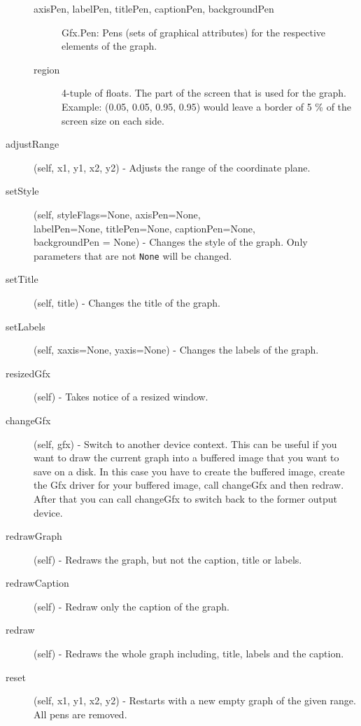 \documentclass[12pt,a4paper,USenglish]{article}
\begin{document}
\begin{description}
\begin{description}
\item[axisPen, labelPen, titlePen, captionPen, backgroundPen] Gfx.Pen: 
	Pens (sets of graphical attributes) for the respective elements 
        of the graph.
\item[region] 4-tuple of floats. The part of the screen that is used 
	for the graph. Example: (0.05, 0.05, 0.95, 0.95) would leave a 
	border of 5 \% of the screen size on each side.

\end{description}

\item[adjustRange] (self, x1, y1, x2, y2) - Adjusts the range of the
  coordinate plane.

\item[setStyle] (self, styleFlags=None, axisPen=None,\\ 
      labelPen=None, titlePen=None, captionPen=None,\\
      backgroundPen = None) - Changes the style of the graph. 
      Only parameters that are not {\tt None} will be changed.

\item[setTitle] (self, title) - Changes the title of the graph.

\item[setLabels] (self, xaxis=None, yaxis=None) - Changes the labels of
  the graph.

\item[resizedGfx] (self) - Takes notice of a resized window.

\item[changeGfx] (self, gfx) - Switch to another device context. This
  can be useful if you want to draw the current graph into a buffered
  image that you want to save on a disk. In this case you have to
  create the buffered image, create the Gfx driver for your buffered
  image, call changeGfx and then redraw. After that you can call
  changeGfx to switch back to the former output device.

\item[redrawGraph] (self) - Redraws the graph, but not the caption,
  title or labels.

\item[redrawCaption] (self) - Redraw only the caption of the graph.

\item[redraw] (self) - Redraws the whole graph including, title, labels
  and the caption.

\item[reset] (self, x1, y1, x2, y2) - Restarts with a new empty graph
  of the given range. All pens are removed.


\end{description}
\end{document}
